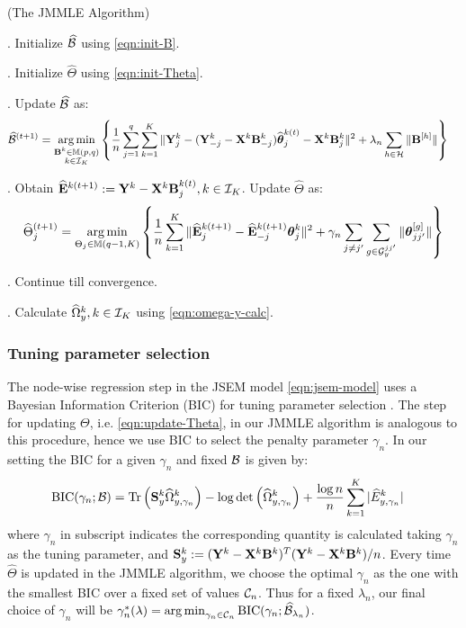 \begin{Algorithm}
(The JMMLE Algorithm)
\label{algo:jmmle-algo}

. Initialize $\widehat {{\cal{B}}}$ using \eqref{eqn:init-B}.

. Initialize $\widehat \Theta$ using \eqref{eqn:init-Theta}.

. Update $\widehat {{\cal{B}}}$ as:
%
\begin{align}\label{eqn:update-B}
\widehat {{\cal{B}}}^{(t+1)} &= \operatorname*{arg\,min}_{\substack{{\mathbf{B}}^k \in {\mathbb{M}}(p,q)\\k \in {\cal{I}}_K}} \left\{ \frac{1}{n} \sum_{j=1}^q \sum_{k=1}^K \| {\mathbf{Y}}^k_j - ({\mathbf{Y}}_{-j}^k - {\mathbf{X}}^k {\mathbf{B}}_{-j}^k) \widehat {{\boldsymbol{\theta}}}_j^{k (t)} - {\mathbf{X}}^k {\mathbf{B}}_j^{k } \|^2
+ \lambda_n \sum_{h \in {\cal{H}}} \| {\mathbf{B}}^{[h]} \| \right\}
\end{align}

. Obtain $\widehat {{\mathbf{E}}}^{k (t+1)} := {\mathbf{Y}}^k - {\mathbf{X}}^k {\mathbf{B}}_j^{k (t)}, k \in {\cal{I}}_K$. Update $\widehat \Theta$ as:
%
\begin{align}\label{eqn:update-Theta}
\widehat \Theta_j^{(t+1)} = \operatorname*{arg\,min}_{\Theta_j \in {\mathbb{M}}(q-1, K)}
\left\{ \frac{1}{n} \sum_{k=1}^K
\| \widehat {{\mathbf{E}}}_j^{k (t+1)} - \widehat {{\mathbf{E}}}_{-j}^{k (t+1)} {\boldsymbol{\theta}}_j^k \|^2
+ \gamma_n \sum_{j \neq j'} \sum_{g \in {\cal{G}}_y^{jj'}} \| {\boldsymbol{\theta}}_{jj'}^{[g]} \| \right\}
\end{align}

. Continue till convergence.

. Calculate $\widehat \Omega_y^k, k \in {\cal{I}}_K$ using \eqref{eqn:omega-y-calc}.
\end{Algorithm}

\subsubsection{Tuning parameter selection}
The node-wise regression step in the JSEM model \eqref{eqn:jsem-model} uses a Bayesian Information Criterion (BIC) for tuning parameter selection {\colr \citep{MaMichailidis15}}. The step for updating $\Theta$, i.e. \eqref{eqn:update-Theta}, in our JMMLE algorithm is analogous to this procedure, hence we use BIC to select the penalty parameter $\gamma_n$. In our setting the BIC for a given $\gamma_n$ and fixed ${\cal{B}}$ is given by:
%
\begin{align*}
\text{BIC} (\gamma_n; {\cal{B}}) &=
\operatorname*{Tr} \left( {\mathbf{S}}_y^k \widehat \Omega_{y,\gamma_n}^k \right) - \log \det \left( \widehat \Omega_{y,\gamma_n}^k \right) +
\frac{\log n}{n} \sum_{k=1}^K | \widehat E_{y,\gamma_n}^k |
\end{align*}
%
where $\gamma_n$ in subscript indicates the corresponding quantity is calculated taking $\gamma_n$ as the tuning parameter, and ${\mathbf{S}}_y^k := ({\mathbf{Y}}^k - {\mathbf{X}}^k {\mathbf{B}}^k)^T ({\mathbf{Y}}^k - {\mathbf{X}}^k {\mathbf{B}}^k)/n$. Every time $\widehat \Theta$ is updated in the JMMLE algorithm, we choose the optimal $\gamma_n$ as the one with the smallest BIC over a fixed set of values ${\cal{C}}_n$. Thus for a fixed $\lambda_n$, our final choice of $\gamma_n$ will be 
$
\gamma_n^* (\lambda) = \operatorname*{arg\,min}_{\gamma_n \in {\cal{C}}_n} \text{BIC} (\gamma_n; \widehat {{\cal{B}}}_{\lambda_n})
$.

